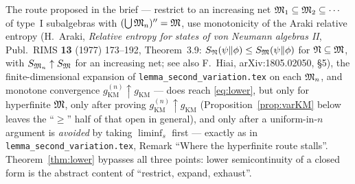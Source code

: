 \documentclass[11pt]{article}
\newcommand{\gKM}{g_{\mathrm{KM}}}\newcommand{\gB}{g_{\mathrm B}}
\begin{document}
\begin{remark}\label{rem:martingale}
The route proposed in the brief --- restrict to an increasing net $\mathfrak M_1\subseteq\mathfrak M_2\subseteq\cdots$ of
type~I subalgebras with $(\bigcup\mathfrak M_n)''=\mathfrak M$, use monotonicity of the Araki relative entropy
(H.~Araki, \emph{Relative entropy for states of von Neumann algebras II}, Publ.\ RIMS \textbf{13} (1977)
173--192, Theorem~3.9: $S_{\mathfrak N}(\psi\Vert\phi)\le S_{\mathfrak M}(\psi\Vert\phi)$ for $\mathfrak N\subseteq\mathfrak M$, with
$S_{\mathfrak M_n}\uparrow S_{\mathfrak M}$ for an increasing net; see also F.~Hiai, arXiv:1805.02050, \S5), the
finite-dimensional expansion of \texttt{lemma\_second\_variation.tex} on each $\mathfrak M_n$, and monotone
convergence $\gKM^{(n)}\uparrow\gKM$ --- does reach \eqref{eq:lower}, but only for hyperfinite $\mathfrak M$,
only after proving $\gKM^{(n)}\uparrow\gKM$ (Proposition~\ref{prop:varKM} below leaves the ``$\ge$'' half of
that open in general), and only after a uniform-in-$n$ argument is \emph{avoided} by taking $\liminf_s$
first --- exactly as in \texttt{lemma\_second\_variation.tex}, Remark ``Where the hyperfinite route stalls''.
Theorem~\ref{thm:lower} bypasses all three points: lower semicontinuity of a closed form is the abstract
content of ``restrict, expand, exhaust''.
\end{remark}
\end{document}
